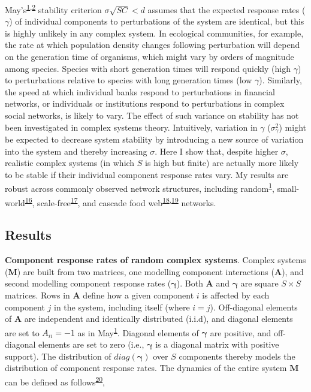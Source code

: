 \documentclass[]{article}
\begin{document}
May's\textsuperscript{\protect\hyperlink{ref-May1972}{1},\protect\hyperlink{ref-Allesina2012}{2}}
stability criterion \(\sigma\sqrt{SC} < d\) assumes that the expected
response rates (\(\gamma\)) of individual components to perturbations of
the system are identical, but this is highly unlikely in any complex
system. In ecological communities, for example, the rate at which
population density changes following perturbation will depend on the
generation time of organisms, which might vary by orders of magnitude
among species. Species with short generation times will respond quickly
(high \(\gamma\)) to perturbations relative to species with long
generation times (low \(\gamma\)). Similarly, the speed at which
individual banks respond to perturbations in financial networks, or
individuals or institutions respond to perturbations in complex social
networks, is likely to vary. The effect of such variance on stability
has not been investigated in complex systems theory. Intuitively,
variation in \(\gamma\) (\(\sigma^{2}_{\gamma}\)) might be expected to
decrease system stability by introducing a new source of variation into
the system and thereby increasing \(\sigma\). Here I show that, despite
higher \(\sigma\), realistic complex systems (in which \(S\) is high but
finite) are actually more likely to be stable if their individual
component response rates vary. My results are robust across commonly
observed network structures, including
random\textsuperscript{\protect\hyperlink{ref-May1972}{1}},
small-world\textsuperscript{\protect\hyperlink{ref-Watts1998}{16}},
scale-free\textsuperscript{\protect\hyperlink{ref-Albert2002}{17}}, and cascade food
web\textsuperscript{\protect\hyperlink{ref-Solow1998}{18},\protect\hyperlink{ref-Williams2000}{19}}
networks.

\subsection{Results}\label{results}

\textbf{Component response rates of random complex systems}. Complex
systems (\(\mathbf{M}\)) are built from two matrices, one modelling
component interactions (\(\mathbf{A}\)), and second modelling component
response rates (\(\boldsymbol{\gamma}\)). Both \(\mathbf{A}\) and
\(\boldsymbol{\gamma}\) are square \(S \times S\) matrices. Rows in
\(\mathbf{A}\) define how a given component \(i\) is affected by each
component \(j\) in the system, including itself (where \(i = j\)).
Off-diagonal elements of \(\mathbf{A}\) are independent and identically
distributed (i.i.d), and diagonal elements are set to \(A_{ii} = -1\) as
in May\textsuperscript{\protect\hyperlink{ref-May1972}{1}}. Diagonal
elements of \(\boldsymbol{\gamma}\) are positive, and off-diagonal
elements are set to zero (i.e., \(\boldsymbol{\gamma}\) is a diagonal
matrix with positive support). The distribution of
\(diag(\boldsymbol{\gamma})\) over \(S\) components thereby models the
distribution of component response rates. The dynamics of the entire
system \(\mathbf{M}\) can be defined as
follows\textsuperscript{\protect\hyperlink{ref-Patel2018}{20}},
\end{document}
